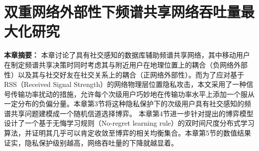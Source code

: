 \chapter{双重网络外部性下频谱共享网络吞吐量最大化研究}
\textbf{本章摘要：} 
本章讨论了具有社交感知的数据库辅助频谱共享网络，其中移动用户在制定频谱共享决策时同时考虑其与附近用户在地理位置上的耦合（负网络外部性）以及其与社交好友在社交关系上的耦合（正网络外部性）。而为了应对基于RSS（Received Signal Strength）的网络物理层位置隐私攻击，本文采用了一种信号传输功率扰动的措施，允许每个次级用户巧妙地在传输功率水平上添加一个服从一定分布的负偏分量。本章第3节将这种隐私保护下的次级用户具有社交感知的频谱共享问题建模成一个随机信道选择博弈。
本章第4节进一步针对提出的博弈模型设计了一个基于无悔学习规则（No-regret learning rule）的双时间尺度分布式学习算法，并证明其几乎可以肯定收敛至博弈的相关均衡集合。本章第5节的数值结果证实，隐私保护级别越高，网络吞吐量的下降就越显着。


